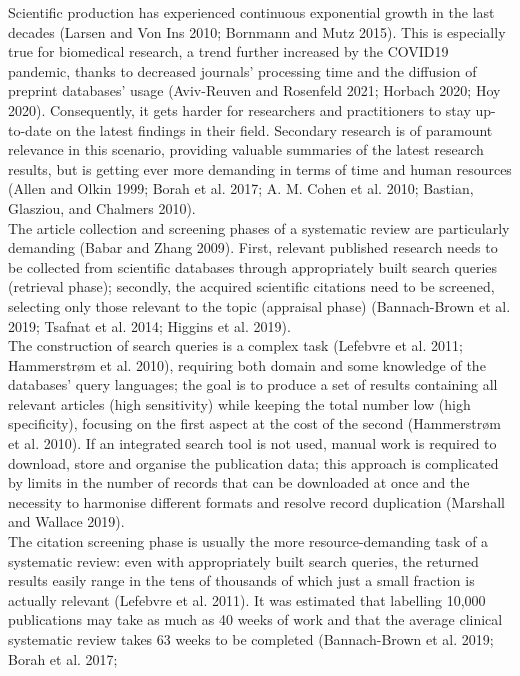 \documentclass{article}
\begin{document}
Scientific production has experienced continuous exponential growth in
the last decades (Larsen and Von Ins 2010; Bornmann and Mutz 2015). This
is especially true for biomedical research, a trend further increased by
the COVID19 pandemic, thanks to decreased journals' processing time and
the diffusion of preprint databases' usage (Aviv-Reuven and Rosenfeld
2021; Horbach 2020; Hoy 2020). Consequently, it gets harder for
researchers and practitioners to stay up-to-date on the latest findings
in their field. Secondary research is of paramount relevance in this
scenario, providing valuable summaries of the latest research results,
but is getting ever more demanding in terms of time and human resources
(Allen and Olkin 1999; Borah et al. 2017; A. M. Cohen et al. 2010;
Bastian, Glasziou, and Chalmers 2010).\\
The article collection and screening phases of a systematic review are
particularly demanding (Babar and Zhang 2009). First, relevant published
research needs to be collected from scientific databases through
appropriately built search queries (retrieval phase); secondly, the
acquired scientific citations need to be screened, selecting only those
relevant to the topic (appraisal phase) (Bannach-Brown et al. 2019;
Tsafnat et al. 2014; Higgins et al. 2019).\\
The construction of search queries is a complex task (Lefebvre et al.
2011; Hammerstrøm et al. 2010), requiring both domain and some knowledge
of the databases' query languages; the goal is to produce a set of
results containing all relevant articles (high sensitivity) while
keeping the total number low (high specificity), focusing on the first
aspect at the cost of the second (Hammerstrøm et al. 2010). If an
integrated search tool is not used, manual work is required to download,
store and organise the publication data; this approach is complicated by
limits in the number of records that can be downloaded at once and the
necessity to harmonise different formats and resolve record duplication
(Marshall and Wallace 2019).\\
The citation screening phase is usually the more resource-demanding task
of a systematic review: even with appropriately built search queries,
the returned results easily range in the tens of thousands of which just
a small fraction is actually relevant (Lefebvre et al. 2011). It was
estimated that labelling 10,000 publications may take as much as 40
weeks of work and that the average clinical systematic review takes 63
weeks to be completed (Bannach-Brown et al. 2019; Borah et al. 2017;
\end{document}
